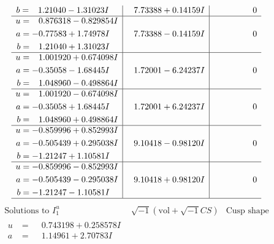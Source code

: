 \documentclass[1p]{elsarticle_modified}
\theoremstyle{definition}
\newcommand{\I}{\sqrt{-1}}
\begin{document}
$$\begin{array}{c|c|c}
\begin{aligned}
b &= \phantom{-}1.21040 - 1.31023 I\end{aligned}
 & \phantom{-}7.73388 + 0.14159 I & \phantom{-0.000000 } 0 \\ \hline\begin{aligned}
u &= \phantom{-}0.876318 - 0.829854 I \\
a &= -0.77583 + 1.74978 I \\
b &= \phantom{-}1.21040 + 1.31023 I\end{aligned}
 & \phantom{-}7.73388 - 0.14159 I & \phantom{-0.000000 } 0 \\ \hline\begin{aligned}
u &= \phantom{-}1.001920 + 0.674098 I \\
a &= -0.35058 - 1.68445 I \\
b &= \phantom{-}1.048960 - 0.498864 I\end{aligned}
 & \phantom{-}1.72001 - 6.24237 I & \phantom{-0.000000 } 0 \\ \hline\begin{aligned}
u &= \phantom{-}1.001920 - 0.674098 I \\
a &= -0.35058 + 1.68445 I \\
b &= \phantom{-}1.048960 + 0.498864 I\end{aligned}
 & \phantom{-}1.72001 + 6.24237 I & \phantom{-0.000000 } 0 \\ \hline\begin{aligned}
u &= -0.859996 + 0.852993 I \\
a &= -0.505439 + 0.295038 I \\
b &= -1.21247 + 1.10581 I\end{aligned}
 & \phantom{-}9.10418 - 0.98120 I & \phantom{-0.000000 } 0 \\ \hline\begin{aligned}
u &= -0.859996 - 0.852993 I \\
a &= -0.505439 - 0.295038 I \\
b &= -1.21247 - 1.10581 I\end{aligned}
 & \phantom{-}9.10418 + 0.98120 I & \phantom{-0.000000 } 0\\
 \hline 
 \end{array}$$\newpage$$\begin{array}{c|c|c}  
\text{Solutions to }I^u_{1}& \I (\text{vol} + \sqrt{-1}CS) & \text{Cusp shape}\\
 \hline 
\begin{aligned}
u &= \phantom{-}0.743198 + 0.258578 I \\
a &= \phantom{-}1.14961 + 2.70783 I \\

\end{aligned}
\end{array}$$
\end{document}
